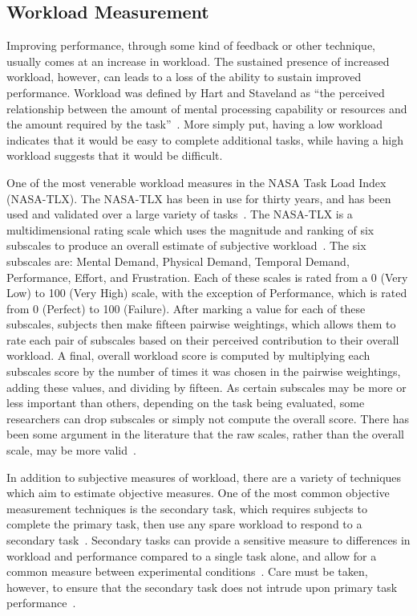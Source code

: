 \documentclass[float=false, crop=false]{standalone}
\begin{document}
\subsection{Workload Measurement}
Improving performance, through some kind of feedback or other technique, usually comes at an increase in workload.
The sustained presence of increased workload, however, can leads to a loss of the ability to sustain improved performance.
Workload was defined by Hart and Staveland as ``the perceived relationship between the amount of mental processing capability or resources and the amount required by the task''~\cite{Hart1988}.
More simply put, having a low workload indicates that it would be easy to complete additional tasks, while having a high workload suggests that it would be difficult.

One of the most venerable workload measures in the NASA Task Load Index (NASA-TLX).
The NASA-TLX has been in use for thirty years, and has been used and validated over a large variety of tasks~\cite{Hart2006}.
The NASA-TLX is a multidimensional rating scale which uses the magnitude and ranking of six subscales to produce an overall estimate of subjective workload~\cite{Hart1988}.
The six subscales are: Mental Demand, Physical Demand, Temporal Demand, Performance, Effort, and Frustration.
Each of these scales is rated from a 0 (Very Low) to 100 (Very High) scale, with the exception of Performance, which is rated from 0 (Perfect) to 100 (Failure).
After marking a value for each of these subscales, subjects then make fifteen pairwise weightings, which allows them to rate each pair of subscales based on their perceived contribution to their overall workload.
A final, overall workload score is computed by multiplying each subscales score by the number of times it was chosen in the pairwise weightings, adding these values, and dividing by fifteen.
As certain subscales may be more or less important than others, depending on the task being evaluated, some researchers can drop subscales or simply not compute the overall score.
There has been some argument in the literature that the raw scales, rather than the overall scale, may be more valid~\cite{bustamante2008measurement}.

In addition to subjective measures of workload, there are a variety of techniques which aim to estimate objective measures.
One of the most common objective measurement techniques is the secondary task, which requires subjects to complete the primary task, then use any spare workload to respond to a secondary task~\cite{gawron2008human}.
Secondary tasks can provide a sensitive measure to differences in workload and performance compared to a single task alone, and allow for a common measure between experimental conditions~\cite{slocum1971meaningful}.
Care must be taken, however, to ensure that the secondary task does not intrude upon primary task performance~\cite{williges1979behavioral}.
\end{document}
